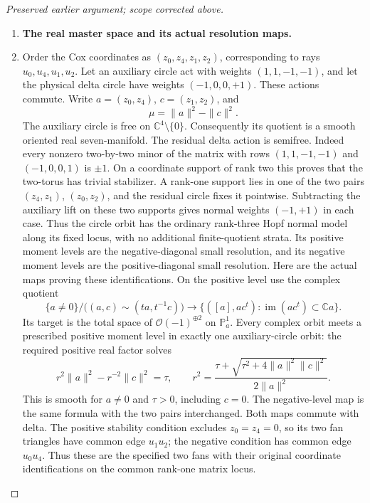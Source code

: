 \begin{proof}[Preserved earlier argument; scope corrected above]
\begin{enumerate}[label=\arabic*.]
\item \par\medskip\noindent\textbf{The real master space and its actual resolution maps.}\enspace

\item Order the Cox coordinates as \((z_0,z_4,z_1,z_2)\), corresponding
to rays \(u_0,u_4,u_1,u_2\).  Let an auxiliary circle act with
weights \((1,1,-1,-1)\), and let the physical delta circle have
weights \((-1,0,0,+1)\).  These actions commute.  Write
\(a=(z_0,z_4)\), \(c=(z_1,z_2)\), and
\[
       \mu=\|a\|^2-\|c\|^2.
\]
The auxiliary circle is free on \(\mathbb C^4\setminus\{0\}\).
Consequently its quotient is a smooth oriented real seven-manifold.
The residual delta action is semifree.  Indeed every nonzero
two-by-two minor of the matrix with rows
\((1,1,-1,-1)\) and \((-1,0,0,1)\) is \(\pm1\).
On a coordinate support of rank two this proves that the
two-torus has trivial stabilizer.  A rank-one support lies in
one of the two pairs \((z_4,z_1)\), \((z_0,z_2)\),
and the residual circle fixes it pointwise.  Subtracting the
auxiliary lift on these two supports gives normal weights
\((-1,+1)\) in each case.  Thus the circle orbit has the
ordinary rank-three Hopf normal model along its fixed locus,
with no additional finite-quotient strata.
Its positive moment levels are the negative-diagonal small resolution,
and its negative moment levels are the positive-diagonal small
resolution.  Here are the actual maps proving these identifications.
On the positive level use the complex quotient
\[
   \{a\ne0\}\big/\bigl((a,c)\sim(ta,t^{-1}c)\bigr)
       \longrightarrow
   \{([a],ac^t):\operatorname{im}(ac^t)\subset\mathbb Ca\}.
\]
Its target is the total space of \(\mathcal O(-1)^{\oplus2}\)
on \(\mathbb P^1_a\).  Every complex orbit meets a prescribed
positive moment level in exactly one auxiliary-circle orbit:
the required positive real factor solves
\[
 r^2\|a\|^2-r^{-2}\|c\|^2=\tau,
 \qquad
 r^2=\frac{\tau+\sqrt{\tau^2+4\|a\|^2\|c\|^2}}
                 {2\|a\|^2}.
\]
This is smooth for \(a\ne0\) and \(\tau>0\), including
\(c=0\).  The negative-level map is the same formula with
the two pairs interchanged.  Both maps commute with delta.
The positive stability condition excludes \(z_0=z_4=0\),
so its two fan triangles have common edge \(u_1u_2\);
the negative condition has common edge \(u_0u_4\).
Thus these are the specified two fans with their original
coordinate identifications on the common rank-one matrix locus.


\end{enumerate}
\end{proof}
